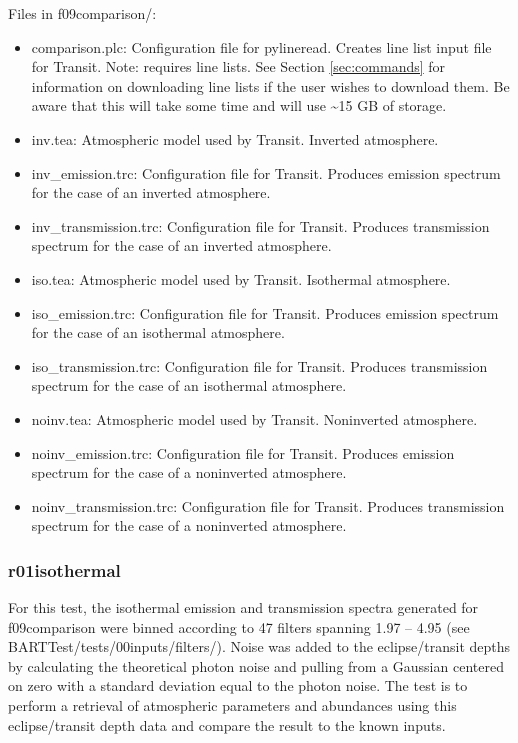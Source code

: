 \documentclass[letterpaper, 12pt]{article}
\begin{document}
Files in f09comparison/:
\begin{itemize} \itemsep0pt
  \item comparison.plc: Configuration file for pylineread. Creates 
        line list input file for Transit. Note: requires line lists. See 
        Section \ref{sec:commands} for information on downloading line lists if 
        the user wishes to download them. Be aware that this will take some 
        time and will use {\sim}15 GB of storage.
  \item inv.tea: Atmospheric model used by Transit. Inverted atmosphere.
  \item inv{\_}emission.trc: Configuration file for Transit. Produces 
        emission spectrum for the case of an inverted atmosphere.
  \item inv{\_}transmission.trc: Configuration file for Transit. Produces 
        transmission spectrum for the case of an inverted atmosphere.
  \item iso.tea: Atmospheric model used by Transit. Isothermal atmosphere.
  \item iso{\_}emission.trc: Configuration file for Transit. Produces 
        emission spectrum for the case of an isothermal atmosphere.
  \item iso{\_}transmission.trc: Configuration file for Transit. Produces 
        transmission spectrum for the case of an isothermal atmosphere.
  \item noinv.tea: Atmospheric model used by Transit. Noninverted atmosphere.
  \item noinv{\_}emission.trc: Configuration file for Transit. Produces 
        emission spectrum for the case of a noninverted atmosphere.
  \item noinv{\_}transmission.trc: Configuration file for Transit. Produces 
        transmission spectrum for the case of a noninverted atmosphere.
\end{itemize}

\subsubsection{r01isothermal}
\label{sec:retrievals}
For this test, the isothermal emission and transmission spectra generated for 
f09comparison were binned according to 47 filters spanning 
1.97 -- 4.95 \microns (see BARTTest/tests/00inputs/filters/). 
Noise was added to the eclipse/transit 
depths by calculating the theoretical photon noise and pulling from a Gaussian 
centered on zero with a standard deviation equal to the photon noise. The test 
is to perform a retrieval of atmospheric parameters and abundances using this 
eclipse/transit depth data and compare the result to the known inputs.
\end{document}

